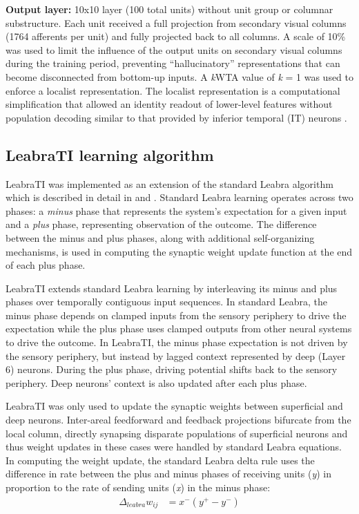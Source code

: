 \documentclass[dwyatte_dissertation.tex]{subfiles}
\begin{document}
\textbf{Output layer:} 10x10 layer (100 total units) without unit group or columnar substructure. Each unit received a full projection from secondary visual columns (1764 afferents per unit) and fully projected back to all columns. A scale of 10\% was used to limit the influence of the output units on secondary visual columns during the training period, preventing ``hallucinatory'' representations that can become disconnected from bottom-up inputs. A \textit{k}WTA value of \textit{k} = 1 was used to enforce a localist representation. The localist representation is a computational simplification that allowed an identity readout of lower-level features without population decoding similar to that provided by inferior temporal (IT) neurons \cite{HungKreimanPoggioEtAl05,LiCoxZoccolanEtAl09}. 

\subsection{LeabraTI learning algorithm}

LeabraTI was implemented as an extension of the standard Leabra algorithm which is described in detail in  and . Standard Leabra learning operates across two phases: a \textit{minus} phase that represents the system's expectation for a given input and a \textit{plus} phase, representing observation of the outcome. The difference between the minus and plus phases, along with additional self-organizing mechanisms, is used in computing the synaptic weight update function at the end of each plus phase. 

LeabraTI extends standard Leabra learning by interleaving its minus and plus phases over temporally contiguous input sequences. In standard Leabra, the minus phase depends on clamped inputs from the sensory periphery to drive the expectation while the plus phase uses clamped outputs from other neural systems to drive the outcome. In LeabraTI, the minus phase expectation is not driven by the sensory periphery, but instead by lagged context represented by deep (Layer 6) neurons. During the plus phase, driving potential shifts back to the sensory periphery. Deep neurons' context is also updated after each plus phase.

LeabraTI was only used to update the synaptic weights between superficial and deep neurons. Inter-areal feedforward and feedback projections bifurcate from the local column, directly synapsing disparate populations of superficial neurons and thus weight updates in these cases were handled by standard Leabra equations. In computing the weight update, the standard Leabra delta rule \cite{OReilly96} uses the difference in rate between the plus and minus phases of receiving units (\textit{y}) in proportion to the rate of sending units (\textit{x}) in the minus phase:
\begin{align*}
\Delta_{leabra} w_{ij} &= x^-(y^+ - y^-)
\end{align*}
\end{document}

